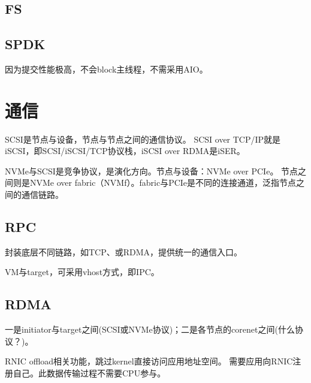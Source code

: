 \subsection{FS}

\subsection{SPDK}

因为提交性能极高，不会block主线程，不需采用AIO。

\section{通信}

SCSI是节点与设备，节点与节点之间的通信协议。
SCSI over TCP/IP就是iSCSI，即SCSI/iSCSI/TCP协议栈，iSCSI over RDMA是iSER。

NVMe与SCSI是竞争协议，是演化方向。节点与设备：NVMe over PCIe。
节点之间则是NVMe over fabric（NVMf）。fabric与PCIe是不同的连接通道，泛指节点之间的通信链路。

\subsection{RPC}

封装底层不同链路，如TCP、或RDMA，提供统一的通信入口。

VM与target，可采用vhost方式，即IPC。

\subsection{RDMA}

一是initiator与target之间(SCSI或NVMe协议)；二是各节点的corenet之间(什么协议？)。

RNIC offload相关功能，跳过kernel直接访问应用地址空间。
需要应用向RNIC注册自己。此数据传输过程不需要CPU参与。

